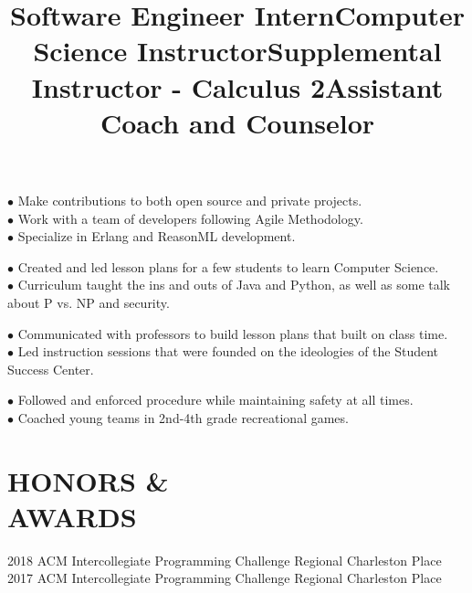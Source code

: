 \documentclass[margin]{res}
\begin{document}
\begin{resume}
\title{\textbf{Software Engineer Intern}}
\begin{position}
$\bullet$ Make contributions to both open source and private projects.\\
$\bullet$ Work with a team of developers following Agile Methodology.\\
$\bullet$ Specialize in Erlang and ReasonML development.
\end{position}


\title{\textbf{Computer Science Instructor}}
\begin{position}
$\bullet$ Created and led lesson plans for a few students to learn Computer Science.\\
$\bullet$ Curriculum taught the ins and outs of Java and Python, as well as some talk about P vs. NP and security.
\end{position}

\title{\textbf{Supplemental Instructor - Calculus 2}}
\begin{position}
$\bullet$ Communicated with professors to build lesson plans that built on class time.\\
$\bullet$ Led instruction sessions that were founded on the ideologies of the Student Success Center.
\end{position}

\title{\textbf{Assistant Coach and Counselor}}
\begin{position}
$\bullet$ Followed and enforced procedure while maintaining safety at all times.\\
$\bullet$ Coached young teams in 2nd-4th grade recreational games.
\end{position}

\section{HONORS \&\\AWARDS}
2018 ACM Intercollegiate Programming Challenge Regional Charleston  Place\\
2017 ACM Intercollegiate Programming Challenge Regional Charleston  Place

\end{resume}
\end{document}
